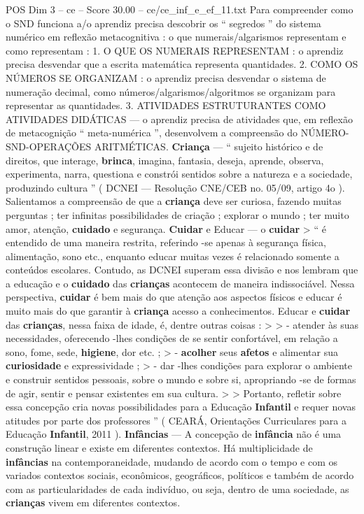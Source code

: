\begin{textsample}{POS Dim 3 – ce – Score 30.00 – ce/ce\_inf\_e\_ef\_11.txt}
Para compreender como o SND funciona a/o aprendiz precisa descobrir os “ segredos ” do sistema numérico em reflexão metacognitiva : o que numerais/algarismos representam e como representam : 1.
O QUE OS NUMERAIS REPRESENTAM : o aprendiz precisa desvendar que a escrita matemática representa quantidades. 2.
COMO OS NÚMEROS SE ORGANIZAM : o aprendiz precisa desvendar o sistema de numeração decimal, como números/algarismos/algoritmos se organizam para representar as quantidades. 3.
ATIVIDADES ESTRUTURANTES COMO ATIVIDADES DIDÁTICAS — o aprendiz precisa de atividades que, em reflexão de metacognição “ meta-numérica ”, desenvolvem a compreensão do NÚMERO-SND-OPERAÇÕES ARITMÉTICAS. \textbf{Criança} — “ sujeito histórico e de direitos, que interage, \textbf{brinca}, imagina, fantasia, deseja, aprende, observa, experimenta, narra, questiona e constrói sentidos sobre a natureza e a sociedade, produzindo cultura ” ( DCNEI — Resolução CNE/CEB no. 05/09, artigo 4o ).
Salientamos a compreensão de que a \textbf{criança} deve ser curiosa, fazendo muitas perguntas ; ter infinitas possibilidades de criação ; explorar o mundo ; ter muito amor, atenção, \textbf{cuidado} e segurança. \textbf{Cuidar} e Educar — o \textbf{cuidar} > “ é entendido de uma maneira restrita, referindo -se apenas à segurança física, alimentação, sono etc., enquanto educar muitas vezes é relacionado somente a conteúdos escolares.
Contudo, as DCNEI superam essa divisão e nos lembram que a educação e o \textbf{cuidado} das \textbf{crianças} acontecem de maneira indissociável.
Nessa perspectiva, \textbf{cuidar} é bem mais do que atenção aos aspectos físicos e educar é muito mais do que garantir à \textbf{criança} acesso a conhecimentos.
Educar e \textbf{cuidar} das \textbf{crianças}, nessa faixa de idade, é, dentre outras coisas : > > - atender às suas necessidades, oferecendo -lhes condições de se sentir confortável, em relação a sono, fome, sede, \textbf{higiene}, dor etc. ; > - \textbf{acolher} seus \textbf{afetos} e alimentar sua \textbf{curiosidade} e expressividade ; > - dar -lhes condições para explorar o ambiente e construir sentidos pessoais, sobre o mundo e sobre si, apropriando -se de formas de agir, sentir e pensar existentes em sua cultura. > > Portanto, refletir sobre essa concepção cria novas possibilidades para a Educação \textbf{Infantil} e requer novas atitudes por parte dos professores ” ( CEARÁ, Orientações Curriculares para a Educação \textbf{Infantil}, 2011 ). \textbf{Infâncias} — A concepção de \textbf{infância} não é uma construção linear e existe em diferentes contextos.
Há multiplicidade de \textbf{infâncias} na contemporaneidade, mudando de acordo com o tempo e com os variados contextos sociais, econômicos, geográficos, políticos e também de acordo com as particularidades de cada indivíduo, ou seja, dentro de uma sociedade, as \textbf{crianças} vivem em diferentes contextos.

\end{textsample}

